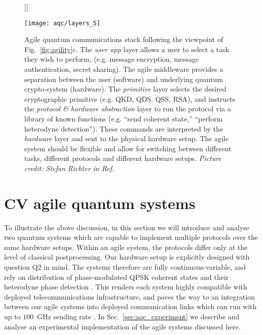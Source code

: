 \begin{figure}[htp]
[\FBwidth]
{\caption{\label{fig:big_agile} Agile quantum communications stack following the viewpoint of Fig.~\ref{fig:agility}c. The \emph{user app} layer allows a user to select a task they wish to perform, (e.g. message encryption, message authentication, secret sharing). The agile middleware provides a separation between the user (software) and underlying quantum crypto-system (hardware). The \emph{primitive} layer selects the desired cryptographic primitive (e.g. QKD, QDS, QSS, RSA), and instructs the \emph{protocol \& hardware abstraction} layer to run the protocol via a library of known functions (e.g. ``send coherent state,'' ``perform heterodyne detection''). These commands are interpreted by the \emph{hardware} layer and sent to the physical hardware setup. The agile system should be flexible and allow for switching between different tasks, different protocols and different hardware setups. \emph{Picture credit: Stefan Richter in Ref.~\cite{Richter2020}}}}
{\texttt{[image: aqc/layers\_5]}}
\end{figure}




\clearpage
\section{CV agile quantum systems}

To illustrate the above discussion, in this section we will introduce and analyse two quantum systems which are capable to implement multiple protocols over the same hardware setups. Within an agile system, the protocols differ only at the level of classical postprocessing. Our hardware setup is explicitly designed with question Q$2$ in mind. The systems therefore are fully continuous-variable, and rely on distribution of phase-modulated QPSK coherent states and their heterodyne phase detection \cite{Agrawal2008}. This renders each system highly compatible with deployed telecommunications infrastructure, and paves the way to an integration between our agile systems into deployed communication links which can run with up to $100$~GHz sending rate \cite{Khan2015, Khan2016}. In Sec.~\ref{sec:aqc_experiment} we describe and analyse an experimental implementation of the agile systems discussed here.

